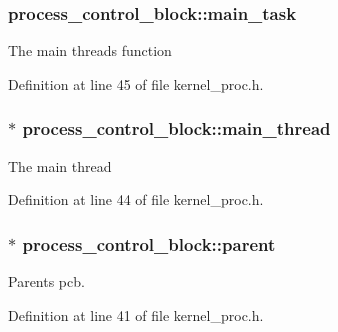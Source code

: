 \subsubsection[{\texorpdfstring{main\+\_\+task}{main_task}}]{ process\+\_\+control\+\_\+block\+::main\+\_\+task}\hypertarget{structprocess__control__block_a7d4ddbf8f67ac2bfe9774796b818354e}{}\label{structprocess__control__block_a7d4ddbf8f67ac2bfe9774796b818354e}
The main thread\textquotesingle{}s function 

Definition at line 45 of file kernel\+\_\+proc.\+h.

\subsubsection[{\texorpdfstring{main\+\_\+thread}{main_thread}}]{$\ast$ process\+\_\+control\+\_\+block\+::main\+\_\+thread}\hypertarget{structprocess__control__block_a3b7a2a952ec5c19d7331307639c78482}{}\label{structprocess__control__block_a3b7a2a952ec5c19d7331307639c78482}
The main thread 

Definition at line 44 of file kernel\+\_\+proc.\+h.

\subsubsection[{\texorpdfstring{parent}{parent}}]{$\ast$ process\+\_\+control\+\_\+block\+::parent}\hypertarget{structprocess__control__block_af20d0c36862c6def80024b4586ff8934}{}\label{structprocess__control__block_af20d0c36862c6def80024b4586ff8934}
Parent\textquotesingle{}s pcb. 

Definition at line 41 of file kernel\+\_\+proc.\+h.

